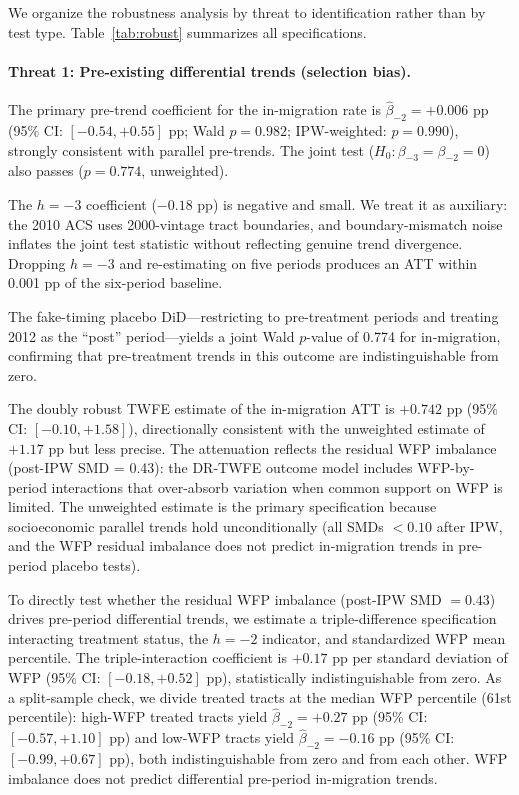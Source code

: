 \documentclass[12pt]{article}
\begin{document}
We organize the robustness analysis by threat to identification
rather than by test type.
Table~\ref{tab:robust} summarizes all specifications.

\paragraph{Threat 1: Pre-existing differential trends (selection bias).}

The primary pre-trend coefficient for the in-migration rate is
$\hat{\beta}_{-2} = +0.006$ pp (95\% CI: $[-0.54, +0.55]$ pp;
Wald $p = 0.982$; IPW-weighted: $p = 0.990$),
strongly consistent with parallel pre-trends.
The joint test ($H_0 \colon \beta_{-3} = \beta_{-2} = 0$)
also passes ($p = 0.774$, unweighted).

The $h = -3$ coefficient ($-0.18$ pp) is negative and small.
We treat it as auxiliary: the 2010 ACS uses 2000-vintage tract boundaries,
and boundary-mismatch noise inflates the joint test statistic
without reflecting genuine trend divergence.
Dropping $h = -3$ and re-estimating on five periods produces an ATT
within 0.001 pp of the six-period baseline.

The fake-timing placebo DiD---restricting to pre-treatment periods
and treating 2012 as the ``post'' period---yields a joint
Wald $p$-value of 0.774 for in-migration,
confirming that pre-treatment trends in this outcome
are indistinguishable from zero.

The doubly robust TWFE estimate of the in-migration ATT is $+0.742$ pp
(95\% CI: $[-0.10, +1.58]$), directionally consistent with the unweighted
estimate of $+1.17$ pp but less precise.
The attenuation reflects the residual WFP imbalance (post-IPW SMD = 0.43):
the DR-TWFE outcome model includes WFP-by-period interactions that
over-absorb variation when common support on WFP is limited.
The unweighted estimate is the primary specification because
socioeconomic parallel trends hold unconditionally (all SMDs $< 0.10$
after IPW, and the WFP residual imbalance does not predict in-migration
trends in pre-period placebo tests).

To directly test whether the residual WFP imbalance (post-IPW SMD $= 0.43$)
drives pre-period differential trends, we estimate a triple-difference
specification interacting treatment status, the $h = -2$ indicator,
and standardized WFP mean percentile.
The triple-interaction coefficient is $+0.17$ pp per standard deviation
of WFP (95\% CI: $[-0.18, +0.52]$ pp), statistically indistinguishable
from zero.
As a split-sample check, we divide treated tracts at the median
WFP percentile (61st percentile): high-WFP treated tracts yield
$\hat{\beta}_{-2} = +0.27$ pp (95\% CI: $[-0.57, +1.10]$ pp)
and low-WFP tracts yield $\hat{\beta}_{-2} = -0.16$ pp
(95\% CI: $[-0.99, +0.67]$ pp), both indistinguishable from zero
and from each other.
WFP imbalance does not predict differential pre-period in-migration trends.
\end{document}
